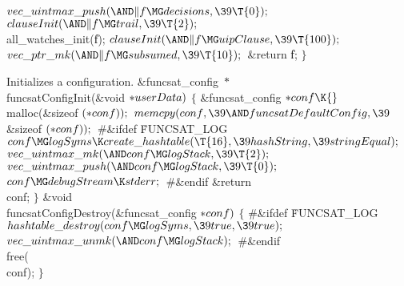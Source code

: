 {{{{{${}\\{vec\_uintmax\_push}({\AND}\|f\MG\\{decisions},\39\T{0});{}$\6
${}\\{clauseInit}({\AND}\|f\MG\\{trail},\39\T{2});{}$\6
\\{all\_watches\_init}(\|f);\6
${}\\{clauseInit}({\AND}\|f\MG\\{uipClause},\39\T{100});{}$\6
${}\\{vec\_ptr\_mk}({\AND}\|f\MG\\{subsumed},\39\T{10});{}$\6
\&{return} \|f;\6
\4${}\}{}$\2\par
\fi

Initializes a  configuration.
\Y\B\&{funcsat\_config} ${}{*}{}$\\{funcsatConfigInit}(\&{void} ${}{*}%
\\{userData}){}$\1\1\2\2\6
${}\{{}$\1\6
\&{funcsat\_config} ${}{*}\\{conf}\K{}$\\{malloc}(\&{sizeof} ${}({*}%
\\{conf}));{}$\7
${}\\{memcpy}(\\{conf},\39{\AND}\\{funcsatDefaultConfig},\39{}$\&{sizeof}
${}({*}\\{conf}));{}$\6
\8\#\&{ifdef} \.{FUNCSAT\_LOG}\6
${}\\{conf}\MG\\{logSyms}\K\\{create\_hashtable}(\T{16},\39\\{hashString},\39%
\\{stringEqual});{}$\6
${}\\{vec\_uintmax\_mk}({\AND}\\{conf}\MG\\{logStack},\39\T{2});{}$\6
${}\\{vec\_uintmax\_push}({\AND}\\{conf}\MG\\{logStack},\39\T{0});{}$\6
${}\\{conf}\MG\\{debugStream}\K\\{stderr};{}$\6
\8\#\&{endif}\6
\&{return} \\{conf};\6
\4${}\}{}$\2\7
\&{void} \\{funcsatConfigDestroy}(\&{funcsat\_config} ${}{*}\\{conf}){}$\1\1\2%
\2\6
${}\{{}$\6
\8\#\&{ifdef} \.{FUNCSAT\_LOG}\1\6
${}\\{hashtable\_destroy}(\\{conf}\MG\\{logSyms},\39\\{true},\39\\{true});{}$\6
${}\\{vec\_uintmax\_unmk}({\AND}\\{conf}\MG\\{logStack});{}$\6
\8\#\&{endif}\6
\\{free}(\\{conf});\6
\4${}\}{}$\2\par
\fi

}}}}}
